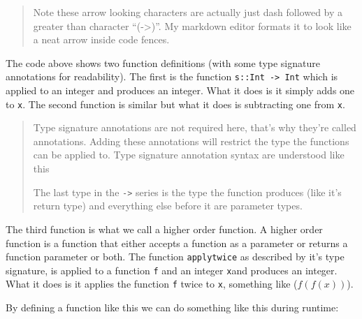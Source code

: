\begin{quote}
Note these arrow looking characters are actually just dash followed by a
greater than character ``(-\textgreater)''. My markdown editor formats
it to look like a neat arrow inside code fences.
\end{quote}

The code above shows two function definitions (with some type signature
annotations for readability). The first is the function
\texttt{s::Int\ -\textgreater{}\ Int} which is applied to an integer and
produces an integer. What it does is it simply adds one to \texttt{x}.
The second function is similar but what it does is subtracting one from
\texttt{x}.

\begin{quote}
Type signature annotations are not required here, that's why they're
called annotations. Adding these annotations will restrict the type the
functions can be applied to. Type signature annotation syntax are
understood like this

\begin{Shaded}
\begin{Highlighting}[]
  \OtherTok{{-}\textgreater{}}  \OtherTok{{-}\textgreater{}}  \OtherTok{{-}\textgreater{}} 
\end{Highlighting}
\end{Shaded}

The last type in the \texttt{-\textgreater{}} series is the type the
function produces (like it's return type) and everything else before it
are parameter types.
\end{quote}

The third function is what we call a higher order function. A higher
order function is a function that either accepts a function as a
parameter or returns a function parameter or both. The function
\texttt{applytwice} as described by it's type signature, is applied to a
function \texttt{f} and an integer \texttt{x}and produces an integer.
What it does is it applies the function \texttt{f} twice to \texttt{x},
something like (\(f(f(x))\)).

By defining a function like this we can do something like this during
runtime:

\begin{Shaded}
\begin{Highlighting}[]
\OperatorTok{\textgreater{}}
\OperatorTok{\textgreater{}}
\end{Highlighting}
\end{Shaded}


